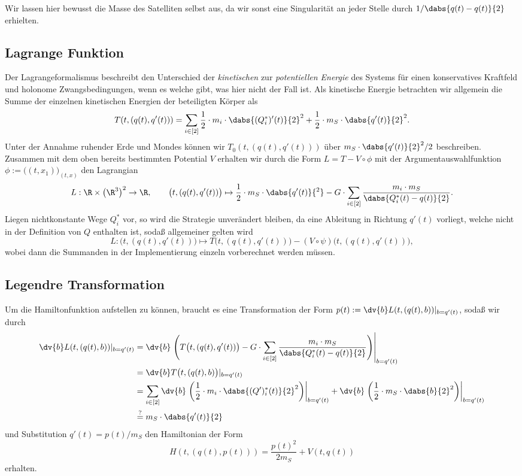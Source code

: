 \documentclass{subfiles}
\begin{document}
        Wir lassen hier bewusst die Masse des Satelliten selbst aus, da wir sonst eine Singularität an jeder Stelle durch $1/\dabs{q(t)-q(t)}{2}$ erhielten. 

    \subsection*{Lagrange Funktion}
        Der Lagrangeformalismus beschreibt den Unterschied der \emph{kinetischen} zur \emph{potentiellen Energie} des Systems für einen konservatives Kraftfeld und holonome Zwangsbedingungen, wenn es welche gibt, was hier nicht der Fall ist. Als kinetische Energie betrachten wir allgemein die Summe der einzelnen kinetischen Energien der beteiligten Körper als
        \[
            T(t,(q(t),q'(t))) = \sum_{i\in[2]}\frac12\cdot m_i\cdot\dabs{(Q_i^*)'(t)}{2}^2 + \frac12\cdot m_S\cdot\dabs{q'(t)}{2}^2.
        \]
        Unter der Annahme ruhender Erde und Mondes können wir $T_0(t,(q(t),q'(t)))$ über $m_S\cdot \dabs{q'(t)}{2}^2 / 2$ beschreiben. Zusammen mit dem oben bereits bestimmten Potential $V$ erhalten wir durch die Form $L = T - V\circ\phi$ mit der Argumentauswahlfunktion $\phi:=\bigl((t,x_1)\bigr)_{(t,x)}$ den Lagrangian
        \[
            L:\R\times\bigl(\R^3\bigr)^2\to\R,\qquad \bigl(t,(q(t),q'(t))\bigr)\mapsto \frac12\cdot m_S\cdot\dabs{q'(t)}{^2} - G\cdot\sum_{i\in[2]}\frac{m_i\cdot m_S}{\dabs{Q_i^*(t) - q(t)}{2}}.
        \]
        Liegen nichtkonstante Wege $Q_i^*$ vor, so wird die Strategie unverändert bleiben, da eine Ableitung in Richtung $q'(t)$ vorliegt, welche nicht in der Definition von $Q$ enthalten ist, sodaß allgemeiner gelten wird
        \[
            L:\bigl(t,(q(t),q'(t))\bigr)\mapsto T\bigl(t,(q(t),q'(t))\bigr) - (V\circ\psi)\bigl(t,(q(t),q'(t))\bigr),
        \]
        wobei dann die Summanden in der Implementierung einzeln vorberechnet werden müssen.
        

    \subsection*{Legendre Transformation}
        Um die Hamiltonfunktion aufstellen zu können, braucht es eine Transformation der Form $p(t):=\dv{b}L(t,(q(t),b))|_{b=q'(t)}$, sodaß wir durch 
        \begin{align*}
            \dv{b}L(t,(q(t),b))|_{b=q'(t)} &= \dv{b}\left.\Biggl(
                T\bigl(t,(q(t),q'(t))\bigr) - G\cdot\sum_{i\in[2]}\frac{m_i\cdot m_S}{\dabs{Q_i^*(t) - q(t)}{2}}    
            \Biggr)\right|_{b=q'(t)} \\
            &= \dv{b}T\bigl(t,(q(t),b)\bigr)|_{b=q'(t)} \\
            &= \sum_{i\in[2]}\dv{b}\left.\biggl(\frac12\cdot m_i\cdot\dabs{(Q')_i^*(t)}{2}^2\biggr)\right|_{b=q'(t)} + \dv{b}\left.\biggl(\frac12\cdot m_S\cdot\dabs{b}{2}^2\biggr)\right|_{b=q'(t)} \\
            &\stackrel{?}{=}m_S\cdot \dabs{q'(t)}{2}
        \end{align*}
        und Substitution $q'(t) = p(t) / m_S$ den Hamiltonian der Form 
        \[
            H(t,(q(t),p(t))) = \frac{p(t)^2}{2m_S} + V(t,q(t))
        \]
        erhalten. 
\end{document}
